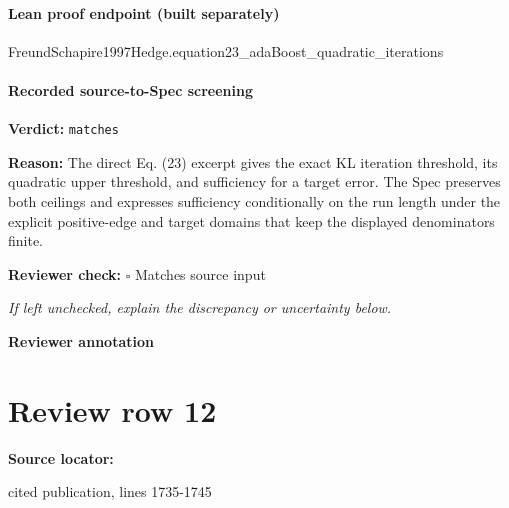 \documentclass[10pt]{article}
\newcommand{\reviewerbox}{%
  \par\noindent\fbox{\parbox{0.96\linewidth}{\rule{0pt}{0.38in}}}\par
}
\newcommand{\reviewmatch}[1]{%
  \par\noindent\textbf{Reviewer check:} $\square$\; #1\par
  \noindent\emph{If left unchecked, explain the discrepancy or uncertainty below.}\par
}
\begin{document}
\paragraph{Lean proof endpoint (built separately)}\begin{ReviewVerbatim}
FreundSchapire1997Hedge.equation23_adaBoost_quadratic_iterations
\end{ReviewVerbatim}

\paragraph{Recorded source-to-Spec screening}
\textbf{Verdict:} \texttt{matches}
\\
{\raggedright
\textbf{Reason:} The direct Eq.\allowbreak{} (23) excerpt gives the exact KL iteration threshold, its quadratic upper threshold, and sufficiency for a target error.\allowbreak{} The Spec preserves both ceilings and expresses sufficiency conditionally on the run length under the explicit positive-\allowbreak{}edge and target domains that keep the displayed denominators finite.\allowbreak{}
\par}
\reviewmatch{Matches source input}
\noindent\textbf{Reviewer annotation}\par
\reviewerbox
\clearpage
\hypertarget{source-claim-8631dcd2356534ad}{}
\section*{Review row 12}
\textbf{Source locator:} {\footnotesize\raggedright cited publication, lines 1735-\allowbreak{}1745\par}
\end{document}
